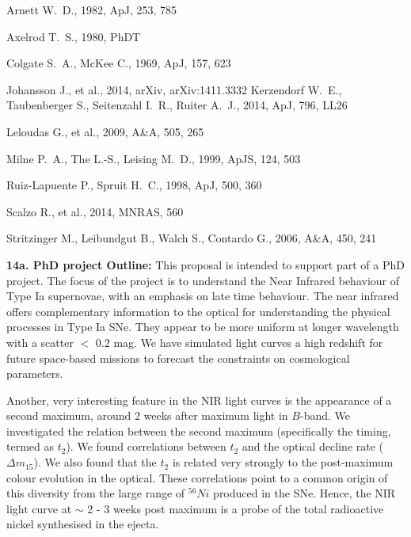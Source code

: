 \documentclass[11pt]{article}
\begin{document}
{%
\begin{thebibliography}{99}
 Arnett 
W.~D., 1982, ApJ, 253, 785

  Axelrod T.~S., 1980, PhDT 

 Colgate S.~A., McKee C., 1969, ApJ, 157, 623 

 Johansson J., et al., 2014, arXiv, 
arXiv:1411.3332 
 Kerzendorf W.~E., Taubenberger S., 
Seitenzahl I.~R., Ruiter A.~J., 2014, ApJ, 796, LL26


 Leloudas G., et al., 2009, A\&A, 505, 265 

 Milne P.~A., The L.-S., Leising M.~D., 1999, ApJS, 124, 503 

 Ruiz-Lapuente P., Spruit H.~C., 1998, ApJ, 500, 360 

Scalzo R., et al., 2014, MNRAS, 560 


 Stritzinger M., Leibundgut B., Walch S.,
Contardo G., 2006, A\&A, 450, 241 


\end{thebibliography}


\newpage
{\bf 14a. PhD project Outline:}
This proposal is intended to support part of a PhD project. The focus of the project is to understand the Near Infrared behaviour of Type Ia supernovae, with an emphasis on late time behaviour. 
The near infrared offers complementary information to the optical for understanding the physical processes in Type Ia SNe. They appear to be more uniform at longer wavelength with a scatter $< $ 0.2 mag. We have simulated light curves a high redshift for future space-based missions to forecast the constraints on cosmological parameters. 

Another, very interesting feature in the NIR light curves is the appearance of a second maximum, around 2 weeks after maximum light in $B$-band. We investigated the relation between the second maximum (specifically the timing, termed as $t_2$). We found correlations between $t_2$ and the optical decline rate ($\Delta m_{15}$). We also found that the $t_2$ is related very strongly to the post-maximum colour evolution in the optical. These correlations point to a common origin of this diversity from the large range of $^{56}Ni$ produced in the SNe. Hence, the NIR light curve at $\sim$ 2 - 3 weeks post maximum is a probe of the total radioactive nickel synthesised in the ejecta. 

}
\end{document}
